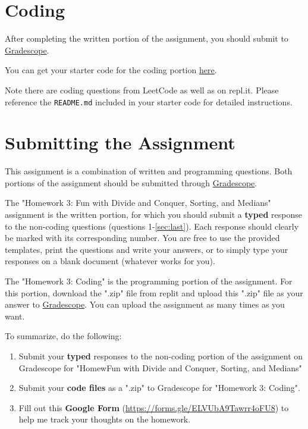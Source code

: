 \documentclass [12pt]{article}
\begin{document}
\section{Coding }
 After completing the written portion of the assignment, you should submit to \href{https://www.gradescope.com/courses/350304}{Gradescope}.

You can get your starter code for the coding portion \href{https://replit.com/team/COMP285/HW2-Code}{here}.

Note there are coding questions from LeetCode as well as on repl.it. Please reference the \texttt{README.md} included in your starter code for detailed instructions.

\section*{Submitting the Assignment}

This assignment is a combination of written and programming questions. Both portions of the assignment should be submitted through \href{https://www.gradescope.com/courses/350304}{Gradescope}.

The "Homework 3: Fun with Divide and Conquer, Sorting, and Medians" assignment is the written portion, for which you should submit a \textbf{typed} response to the non-coding questions (questions 1-\ref{sec:last}). Each response should clearly be marked with its corresponding number. You are free to use the provided templates, print the questions and write your answers, or to simply type your responses on a blank document (whatever works for you).

The "Homework 3: Coding" is the programming portion of the assignment. For this portion, download the ".zip" file from replit and upload this ".zip" file as your answer to \href{https://www.gradescope.com/courses/350304}{Gradescope}. You can upload the assignment as many times as you want.


To summarize, do the following:
\begin{enumerate}
    \item Submit your \textbf{typed} responses to the non-coding portion of the assignment on Gradescope for "HomewFun with Divide and Conquer, Sorting, and Medians"
    \item Submit your \textbf{code files} as a ".zip" to Gradescope for "Homework 3: Coding".
    \item Fill out this \textbf{Google Form} (\href{https://forms.gle/ELVUbA9Tawrr4oFU8}{https://forms.gle/ELVUbA9Tawrr4oFU8}) to help me track your thoughts on the homework.
\end{enumerate}
\end{document}
